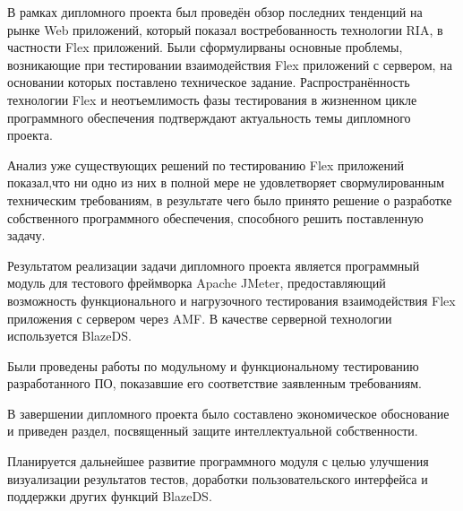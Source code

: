 \Conclusion

В рамках дипломного проекта был проведён обзор последних тенденций на рынке Web приложений, который
показал востребованность технологии RIA, в частности Flex приложений. Были сформулирваны основные проблемы,
возникающие при тестировании взаимодействия Flex приложений с сервером, на основании которых
поставлено техническое задание. Распространённость технологии
Flex и неотъемлимость фазы тестирования в жизненном цикле программного обеспечения подтверждают
актуальность темы дипломного проекта.

Анализ уже существующих решений по тестированию Flex приложений показал,что ни одно из них в полной мере не
удовлетворяет свормулированным техническим требованиям, в результате чего было принято решение о разработке
собственного программного обеспечения, способного решить поставленную задачу.

Результатом реализации задачи дипломного проекта является программный модуль для тестового фреймворка
Apache JMeter, предоставляющий возможность функционального и нагрузочного тестирования взаимодействия Flex
приложения с сервером через AMF. В качестве серверной технологии используется BlazeDS.

Были проведены работы по модульному и функциональному тестированию разработанного ПО, показавшие его соответствие
заявленным требованиям.

В завершении дипломного проекта было составлено экономическое обоснование и приведен раздел,
посвященный защите интеллектуальной собственности.

Планируется дальнейшее развитие программного модуля с целью улучшения визуализации результатов тестов,
доработки пользовательского интерфейса и поддержки других функций BlazeDS.

